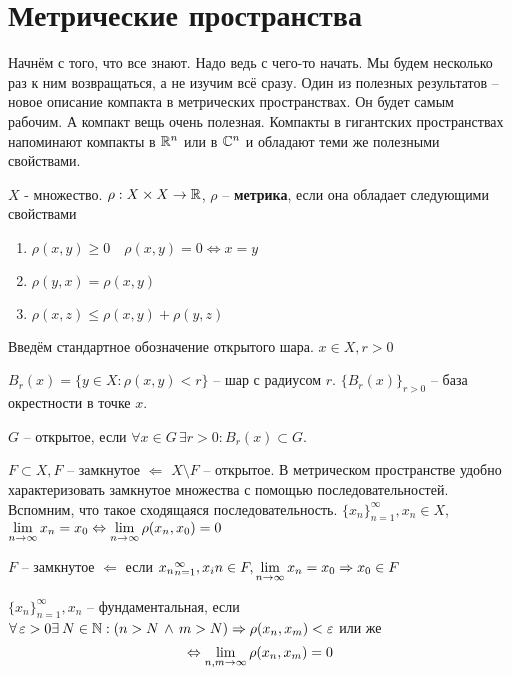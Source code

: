 \documentclass[document]{subfiles}
\begin{document}
\chapter{Метрические пространства}
Начнём с того, что все знают. Надо ведь с чего-то начать. Мы будем несколько раз к ним возвращаться, а не изучим всё сразу. Один из полезных результатов -- новое описание компакта в метрических пространствах. Он будет
самым рабочим. А компакт вещь очень полезная. Компакты в гигантских пространствах напоминают компакты в $\mathbb{R}^n$ или в $\mathbb{C}^n$ и обладают теми же полезными свойствами.

\begin{definition}[Метрика]
    $X$ - множество. $\rho: X \times X \rightarrow \mathbb{R}$, $\rho$ -- \textbf{метрика}, если она обладает следующими свойствами
    \begin{enumerate}
        \item $\rho(x,y) \geq 0 \quad \rho(x,y) = 0 \Leftrightarrow x = y$
        \item $\rho(y,x) = \rho(x,y)$
        \item $\rho(x,z) \leq \rho(x,y) + \rho(y,z)$
    \end{enumerate}
\end{definition}

Введём стандартное обозначение открытого шара. $x \in X, r > 0$

$B_r(x) = \{y \in X: \rho(x,y) < r \}$ -- шар с радиусом $r$.
$ \{B_r(x) \}_{r > 0}$ -- база окрестности в точке $x$.

$G$ -- открытое, если $\forall x \in G \, \exists r > 0 : B_r(x) \subset G$.

$F \subset X, F$ -- замкнутое $\Leftarrow$ $X \setminus F$ -- открытое.
В метрическом пространстве удобно характеризовать замкнутое множества с помощью последовательностей. Вспомним, что такое сходящаяся последовательность.
$\{x_n\}_{n=1}^\infty, x_n \in X$, $\lim\limits_{n \to \infty} x_n = x_0 \Leftrightarrow \lim\limits_{n \to \infty} \rho(x_n, x_0) = 0$

$F$ -- замкнутое $\Leftarrow$ если ${x_n}_{n=1}^\infty, x_in \in F, \lim\limits_{n \to \infty } x_n = x_0 \Rightarrow x_0 \in F$


\begin{definition}
    $\{x_n\}^\infty_{n=1}, x_n$ -- фундаментальная, если $\forall \varepsilon > 0 \exists N \in \bN : (n > N \, \wedge \, m > N) \Rightarrow \rho(x_n, x_m) < \varepsilon$
    или же 
    \[ \Leftrightarrow \lim\limits_{n,m \to \infty} \rho(x_n,x_m) = 0 \]
\end{definition}
\end{document}
